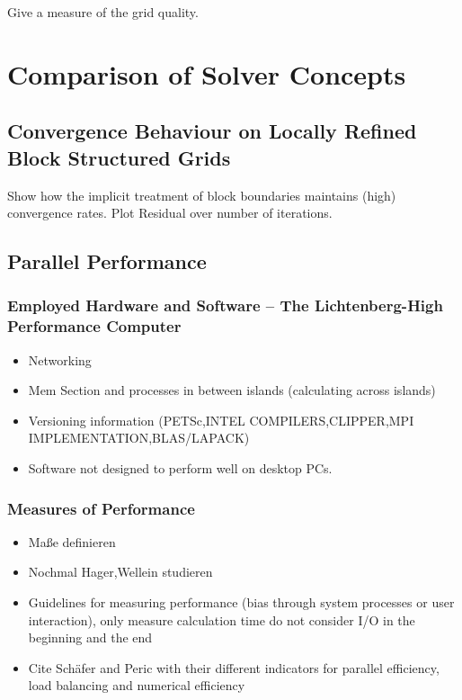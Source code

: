 \documentclass[article,type=msc,colorback,accentcolor=tud2a]{tudthesis}
\begin{document}
        Give a measure of the grid quality.

  \section{Comparison of Solver Concepts}
  
    \subsection{Convergence Behaviour on Locally Refined Block Structured Grids}

      Show how the implicit treatment of block boundaries maintains (high) convergence rates. Plot Residual over number of iterations.

    \subsection{Parallel Performance}
      \subsubsection{Employed Hardware and Software -- The Lichtenberg-High Performance Computer }
        \begin{itemize}
          \item Networking
          \item Mem Section and processes in between islands (calculating across islands)
          \item Versioning information (PETSc,INTEL COMPILERS,CLIPPER,MPI IMPLEMENTATION,BLAS/LAPACK)
          \item Software not designed to perform well on desktop PCs.
        \end{itemize}

      \subsubsection{Measures of Performance}
        \begin{itemize}
          \item Maße definieren
          \item Nochmal Hager,Wellein studieren
          \item Guidelines for measuring performance (bias through system processes or user interaction), only measure calculation time do not consider I/O in the beginning and the end
          \item Cite Schäfer and Peric with their different indicators for parallel efficiency, load balancing and numerical efficiency
        \end{itemize}
\end{document}
